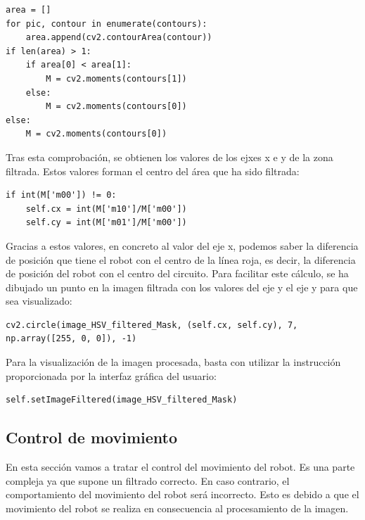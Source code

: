 \lstset{language=Python, breaklines=true, basicstyle=\footnotesize}
\begin{lstlisting}[frame=single]
area = []
for pic, contour in enumerate(contours):
    area.append(cv2.contourArea(contour))
if len(area) > 1:
    if area[0] < area[1]:
        M = cv2.moments(contours[1])
    else:
        M = cv2.moments(contours[0])
else:
    M = cv2.moments(contours[0])
\end{lstlisting}

Tras esta comprobación, se obtienen los valores de los ejxes x e y de la zona filtrada. Estos valores forman el centro del área que ha sido filtrada:

\lstset{language=Python, breaklines=true, basicstyle=\footnotesize}
\begin{lstlisting}[frame=single]
if int(M['m00']) != 0:
    self.cx = int(M['m10']/M['m00'])
    self.cy = int(M['m01']/M['m00'])
\end{lstlisting}

Gracias a estos valores, en concreto al valor del eje x, podemos saber la diferencia de posición que tiene el robot con el centro de la línea roja, es decir, la diferencia de posición del robot con el centro del circuito. Para facilitar este cálculo, se ha dibujado un punto en la imagen filtrada con los valores del eje y el eje y para que sea visualizado:

\lstset{language=Python, breaklines=true, basicstyle=\footnotesize}
\begin{lstlisting}[frame=single]
cv2.circle(image_HSV_filtered_Mask, (self.cx, self.cy), 7, np.array([255, 0, 0]), -1)
\end{lstlisting}

Para la visualización de la imagen procesada, basta con utilizar la instrucción proporcionada por la interfaz gráfica del usuario:

\lstset{language=Python, breaklines=true, basicstyle=\footnotesize}
\begin{lstlisting}[frame=single]
self.setImageFiltered(image_HSV_filtered_Mask)
\end{lstlisting}

\subsection{Control de movimiento}
En esta sección vamos a tratar el control del movimiento del robot. Es una parte compleja ya que supone un filtrado correcto. En caso contrario, el comportamiento del movimiento del robot será incorrecto. Esto es debido a que el movimiento del robot se realiza en consecuencia al procesamiento de la imagen.

